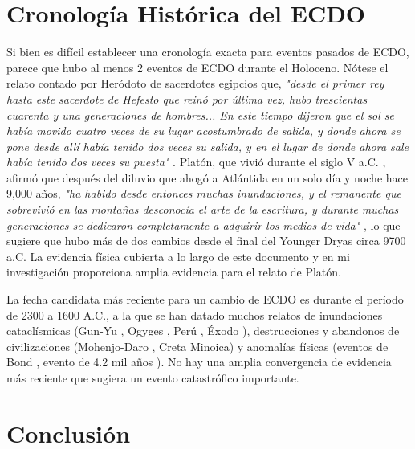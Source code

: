 \documentclass[10pt,twocolumn,letterpaper]{article}
\begin{document}
\section{Cronología Histórica del ECDO}

Si bien es difícil establecer una cronología exacta para eventos pasados de ECDO, parece que hubo al menos 2 eventos de ECDO durante el Holoceno. Nótese el relato contado por Heródoto de sacerdotes egipcios que, \textit{"desde el primer rey hasta este sacerdote de Hefesto que reinó por última vez, hubo trescientas cuarenta y una generaciones de hombres... En este tiempo dijeron que el sol se había movido cuatro veces de su lugar acostumbrado de salida, y donde ahora se pone desde allí había tenido dos veces su salida, y en el lugar de donde ahora sale había tenido dos veces su puesta"} \cite{32}. Platón, que vivió durante el siglo V a.C. \cite{111}, afirmó que después del diluvio que ahogó a Atlántida en un solo día y noche hace 9,000 años, \textit{"ha habido desde entonces muchas inundaciones, y el remanente que sobrevivió en las montañas desconocía el arte de la escritura, y durante muchas generaciones se dedicaron completamente a adquirir los medios de vida"} \cite{112}, lo que sugiere que hubo más de dos cambios desde el final del Younger Dryas circa 9700 a.C. La evidencia física cubierta a lo largo de este documento y en mi investigación \cite{2} proporciona amplia evidencia para el relato de Platón.

La fecha candidata más reciente para un cambio de ECDO es durante el período de 2300 a 1600 A.C., a la que se han datado muchos relatos de inundaciones cataclísmicas (Gun-Yu \cite{113,114,115}, Ogyges \cite{116,117}, Perú \cite{118,119}, Éxodo \cite{120}), destrucciones y abandonos de civilizaciones (Mohenjo-Daro \cite{121}, Creta Minoica\cite{100,101}) y anomalías físicas (eventos de Bond \cite{122}, evento de 4.2 mil años \cite{90}). No hay una amplia convergencia de evidencia más reciente que sugiera un evento catastrófico importante.

\section{Conclusión}
\end{document}
